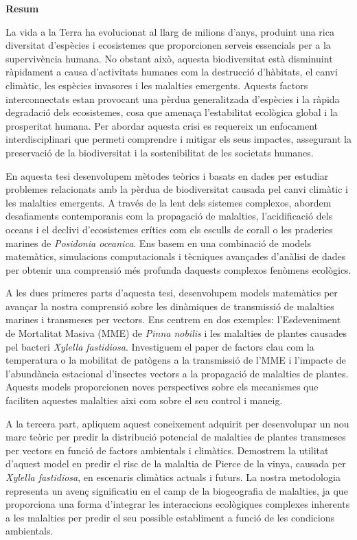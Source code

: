 \pagebreak
\thispagestyle{empty}

\begin{center}
    \textbf{\Large Resum}
\end{center}

La vida a la Terra ha evolucionat al llarg de milions d'anys,
produint una rica diversitat d'espècies i ecosistemes que proporcionen serveis
essencials per a la supervivència humana. No obstant això, aquesta
biodiversitat està disminuint ràpidament a causa d'activitats humanes
com la destrucció d'hàbitats, el canvi climàtic, les espècies invasores i les
malalties emergents. Aquests factors interconnectats estan provocant una pèrdua
generalitzada d'espècies i la ràpida degradació dels ecosistemes, cosa que
amenaça l'estabilitat ecològica global i la prosperitat humana. Per abordar
aquesta crisi es requereix un enfocament interdisciplinari que permeti
comprendre i mitigar els seus impactes, assegurant la preservació de la
biodiversitat i la sostenibilitat de les societats humanes.

En aquesta tesi desenvolupem mètodes teòrics i basats en dades per estudiar
problemes relacionats amb la pèrdua de biodiversitat causada pel canvi
climàtic i les malalties emergents. A través de la lent dels sistemes
complexos, abordem desafiaments contemporanis com la propagació de malalties,
l'acidificació dels oceans i el declivi d'ecosistemes crítics com els esculls
de corall o les praderies marines de \textit{Posidonia oceanica}. Ens basem en
una combinació de models matemàtics, simulacions computacionals i tècniques
avançades d'anàlisi de dades per obtenir una comprensió més profunda daquests
complexos fenòmens ecològics.

A les dues primeres parts d'aquesta tesi, desenvolupem models matemàtics
per avançar la nostra comprensió sobre les dinàmiques de transmissió de
malalties marines i transmeses per vectors. Ens centrem en dos exemples:
l'Esdeveniment de Mortalitat Masiva (MME) de \textit{Pinna nobilis} i les
malalties de plantes causades pel bacteri \textit{Xylella fastidiosa}.
Investiguem el paper de factors clau com la temperatura o la mobilitat de
patògens a la transmissió de l'MME i l'impacte de l'abundància estacional
d'insectes vectors a la propagació de malalties de plantes. Aquests models
proporcionen noves perspectives sobre els mecanismes que faciliten aquestes
malalties aixi com sobre el seu control i maneig.

A la tercera part, apliquem aquest coneixement adquirit per desenvolupar un
nou marc teòric per predir la distribució potencial de malalties de
plantes transmeses per vectors en funció de factors ambientals i
climàtics. Demostrem la utilitat d'aquest model en predir el risc de la
malaltia de Pierce de la vinya, causada per \textit{Xylella fastidiosa}, en
escenaris climàtics actuals i futurs. La nostra metodologia representa un
avenç significatiu en el camp de la biogeografia de malalties, ja que
proporciona una forma d'integrar les interaccions ecològiques complexes
inherents a les malalties per predir el seu possible establiment a
funció de les condicions ambientals.

